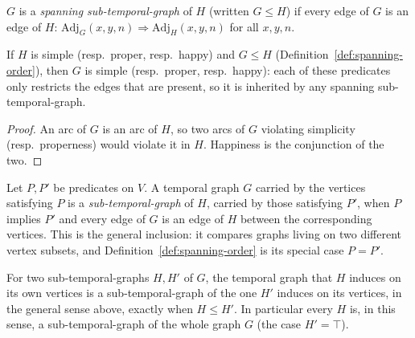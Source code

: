\begin{definition}
  \label{def:spanning-order}
  \leanok
  $G$ is a \emph{spanning sub-temporal-graph} of $H$ (written $G \le H$) if
  every edge of $G$ is an edge of $H$: $\mathrm{Adj}_G(x,y,n) \Rightarrow
  \mathrm{Adj}_H(x,y,n)$ for all $x,y,n$.
\end{definition}

\begin{lemma}
  \label{lem:monotone-simple-proper-happy}
  \leanok
  If $H$ is simple (resp.\ proper, resp.\ happy) and $G \le H$
  (Definition~\ref{def:spanning-order}), then $G$ is simple (resp.\ proper,
  resp.\ happy): each of these predicates only restricts the edges that are
  present, so it is inherited by any spanning sub-temporal-graph.
\end{lemma}

\begin{proof}
  \leanok
  An arc of $G$ is an arc of $H$, so two arcs of $G$ violating simplicity (resp.\ properness) would violate it in $H$. Happiness is the conjunction of the two.
\end{proof}

\begin{definition}
  \label{def:is-subgraph-of}
  \leanok
  Let $P, P'$ be predicates on $V$. A temporal graph $G$ carried by the
  vertices satisfying $P$ is a \emph{sub-temporal-graph} of $H$, carried by
  those satisfying $P'$, when $P$ implies $P'$ and every edge of $G$ is an
  edge of $H$ between the corresponding vertices. This is the general
  inclusion: it compares graphs living on two different vertex subsets, and
  Definition~\ref{def:spanning-order} is its special case $P = P'$.
\end{definition}

\begin{lemma}
  \label{lem:is-subgraph-of-coe}
  \leanok
  For two sub-temporal-graphs $H, H'$ of $G$, the temporal graph that $H$ induces on its own
  vertices is a sub-temporal-graph of the one $H'$ induces on its vertices, in the general sense
  above, exactly when $H \le H'$. In particular every $H$ is, in this sense, a sub-temporal-graph
  of the whole graph $G$ (the case $H' = \top$).
\end{lemma}

